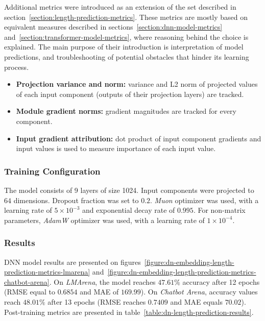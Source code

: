 \documentclass[a4paper,11pt,twoside]{report}
\theoremstyle{definition}
\begin{document}
Additional metrics were introduced as an extension of the set described in section~\ref{section:length-prediction-metrics}. These metrics are mostly based on equivalent measures described in sections~\ref{section:dnn-model-metrics} and~\ref{section:transformer-model-metrics}, where reasoning behind the choice is explained. The main purpose of their introduction is interpretation of model predictions, and troubleshooting of potential obstacles that hinder its learning process.

\begin{itemize}
    \item \textbf{Projection variance and norm:} variance and L2 norm of projected values of each input component (outputs of their projection layers) are tracked.
    \item \textbf{Module gradient norms:} gradient magnitudes are tracked for every component.
    \item \textbf{Input gradient attribution:} dot product of input component gradients and input values is used to measure importance of each input value.
\end{itemize}

\subsubsection{Training Configuration}

The model consists of 9 layers of size 1024. Input components were projected to $64$ dimensions. Dropout fraction was set to $0.2$. \textit{Muon} optimizer was used, with a learning rate of $5 \times 10^{-3}$ and exponential decay rate of $0.995$. For non-matrix parameters, \textit{AdamW} optimizer was used, with a learning rate of $1 \times 10^{-4}$.

\subsubsection{Results}

DNN model results are presented on figures~\ref{figure:dn-embedding-length-prediction-metrics-lmarena} and~\ref{figure:dn-embedding-length-prediction-metrics-chatbot-arena}. On \textit{LMArena}, the model reaches $47.61 \%$ accuracy after 12 epochs (RMSE equal to $0.6854$ and MAE of $169.99$). On \textit{Chatbot Arena}, accuracy values reach $48.01 \%$ after 13 epochs (RMSE reaches $0.7409$ and MAE equals $70.02$). Post-training metrics are presented in table~\ref{table:dn-length-prediction-results}.
\end{document}
